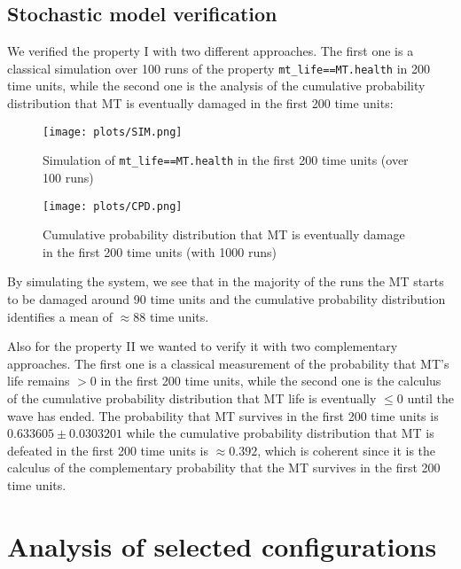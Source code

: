 \documentclass[
10pt, %
a4paper, %
oneside, %
headinclude,footinclude, %
BCOR5mm, %
]{scrartcl}
\begin{document}
		\subsection{Stochastic model verification}
			We verified the property I with two different approaches. The first one is a classical simulation over 100 runs of the property \texttt{mt\_life==MT.health} in 200 time units, while the second one is the analysis of the cumulative probability distribution that MT is eventually damaged in the first 200 time units:
			\begin{figure}[H]
				\centering
				\begin{minipage}{.45\textwidth}
					\centering
					\texttt{[image: plots/SIM.png]}
					\caption{Simulation of \texttt{mt\_life==MT.health} in the first 200 time units (over 100 runs)}
				\end{minipage}
				\begin{minipage}{.45\textwidth}
					\centering
					\texttt{[image: plots/CPD.png]}
					\caption{Cumulative probability distribution that MT is eventually damage in the first 200 time units (with 1000 runs)}
				\end{minipage}
			\end{figure}
			By simulating the system, we see that in the majority of the runs the MT starts to be damaged around 90 time units and the cumulative probability distribution identifies a mean of $\approx88$ time units.
			
			Also for the property II we wanted to verify it with two complementary approaches. The first one is a classical measurement of the probability that MT's life remains $>0$ in the first 200 time units, while the second one is the calculus of the cumulative probability distribution that MT life is eventually $\leq0$ until the wave has ended. The probability that MT survives in the first 200 time units is $0.633605\pm 0.0303201$ while the cumulative probability distribution that MT is defeated in the first 200 time units is $\approx 0.392$, which is coherent since it is the calculus of the complementary probability that the MT survives in the first 200 time units.
			
	\section{Analysis of selected configurations}
\end{document}
